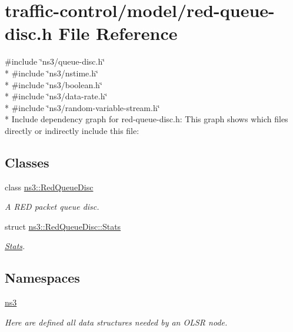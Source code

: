 \hypertarget{red-queue-disc_8h}{}\section{traffic-\/control/model/red-\/queue-\/disc.h File Reference}
\label{red-queue-disc_8h}
{\ttfamily \#include \char`\"{}ns3/queue-\/disc.\+h\char`\"{}}\\*
{\ttfamily \#include \char`\"{}ns3/nstime.\+h\char`\"{}}\\*
{\ttfamily \#include \char`\"{}ns3/boolean.\+h\char`\"{}}\\*
{\ttfamily \#include \char`\"{}ns3/data-\/rate.\+h\char`\"{}}\\*
{\ttfamily \#include \char`\"{}ns3/random-\/variable-\/stream.\+h\char`\"{}}\\*
Include dependency graph for red-\/queue-\/disc.h\+:
This graph shows which files directly or indirectly include this file\+:
\subsection*{Classes}
\begin{DoxyCompactItemize}
\item 
class \hyperlink{classns3_1_1RedQueueDisc}{ns3\+::\+Red\+Queue\+Disc}
\begin{DoxyCompactList}\small\item\em A R\+ED packet queue disc. \end{DoxyCompactList}\item 
struct \hyperlink{structns3_1_1RedQueueDisc_1_1Stats}{ns3\+::\+Red\+Queue\+Disc\+::\+Stats}
\begin{DoxyCompactList}\small\item\em \hyperlink{structns3_1_1RedQueueDisc_1_1Stats}{Stats}. \end{DoxyCompactList}\end{DoxyCompactItemize}
\subsection*{Namespaces}
\begin{DoxyCompactItemize}
\item 
 \hyperlink{namespacens3}{ns3}
\begin{DoxyCompactList}\small\item\em Here are defined all data structures needed by an O\+L\+SR node. \end{DoxyCompactList}\end{DoxyCompactItemize}
